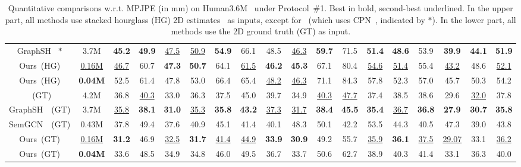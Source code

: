 \documentclass[runningheads]{llncs}
\begin{document}
\begin{table*}
{\begin{tabular}{c| c c c c c c c c c c c c c c c c c}
  GraphSH~\cite{xu2021graph}\hypersetup{citecolor=black} $\ast$ & 3.7M & \textbf{45.2} & \textbf{49.9} & \underline{47.5} & \underline{50.9} & \textbf{54.9} & 66.1 & 48.5 & \underline{46.3} & \textbf{59.7} &\phantom{0}71.5 & \textbf{51.4} & \textbf{48.6} & 53.9 & \textbf{39.9} & \textbf{44.1} & \textbf{51.9} \\ 
 Ours~(HG) & \underline{0.16M} & \underline{46.7} & 60.7 & \textbf{47.3} &\textbf{50.7} &64.1  &\underline{61.5} &\textbf{46.2}  &\textbf{45.3}  &67.1 &\phantom{0}80.4 & \underline{54.6} & \underline{51.4} & 55.4 & \underline{43.2} & 48.6 & \underline{52.1}  \\
 Ours~(HG) & \textbf{0.04M} &52.5& 61.4 & 47.8 & 53.0& 66.4 &65.4 & \underline{48.2} & \underline{46.3}  & 71.1& \phantom{0}84.3 & 57.8 & 52.3 & 57.0 & 45.7 &50.3  & 54.2  \\
 \hline
   \citet{liu2020comprehensive}~(GT) & 4.2M & 36.8 & \underline{40.3} & 33.0 & 36.3 & 37.5 & 45.0 & 39.7 & 34.9 & \underline{40.3} & \phantom{0}\underline{47.7} & 37.4 & 38.5 & 38.6 & 29.6 & \underline{32.0} & 37.8  \\ 
  GraphSH~\cite{xu2021graph}~(GT) & 3.7M & \underline{35.8} & \textbf{38.1} & \textbf{31.0} & \underline{35.3} & \textbf{35.8} & \textbf{43.2} & \underline{37.3} & \underline{31.7} & \textbf{38.4} & \phantom{0}\textbf{45.5} & \textbf{35.4} & \underline{36.7} & \textbf{36.8} & \textbf{27.9} & \textbf{30.7} & \textbf{35.8}  \\
    SemGCN~\cite{zhaoCVPR19semantic}~(GT) & 0.43M & 37.8 & 49.4 & 37.6 & 40.9 & 45.1 & 41.4 & 40.1 & 48.3 & 50.1 & \phantom{0}42.2 & 53.5 & 44.3 & 40.5 & 47.3 & 39.0 & 43.8  \\
 Ours~(GT) & \underline{0.16M} & \textbf{31.2} & 46.9 & \underline{32.5} & \textbf{31.7} & \underline{41.4} & \underline{44.9} & \textbf{33.9} & \textbf{30.9}& 49.2 & \phantom{0}55.7 &\underline{35.9} &\textbf{36.1} & \underline{37.5} &  \underline{29.07} & 33.1& \underline{36.2}  \\ 
 Ours~(GT) & \textbf{0.04M} & 33.6 & 48.5  & 34.9 &34.8 & 46.0 & 49.5 & 36.7 & 33.7 & 50.6 & \phantom{0}62.7 & 38.9 & 40.3 & 41.4 & 33.1 & 36.3 & 40.0 \\ 
\hline
 \end{tabular}
 }

 \caption{
 Quantitative comparisons w.r.t. MPJPE (in mm) on Human3.6M~\cite{h36m_pami} under Protocol~\#1. Best in bold, second-best underlined.
 In the upper part, all methods use stacked hourglass (HG) 2D estimates~\cite{newell2016stacked} as inputs, except for~\cite{xu2021graph} (which uses CPN~\cite{Chen_2018_CVPR}, indicated by $\ast$).
 In the lower part, all methods use the 2D ground truth (GT) as input.
 }
 \label{protocol1}
\end{table*}
\vspace{-30px}
\end{document}
